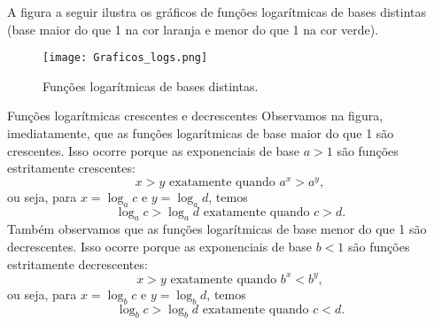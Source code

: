 A figura a seguir ilustra os gráficos de funções logarítmicas de bases distintas (base maior do que 1 na cor laranja e menor do que 1 na cor verde).

\begin{figure}[!htb]
\centering
\texttt{[image: Graficos\_logs.png]}
\caption{Funções logarítmicas de bases distintas.}
\end{figure}


\begin{observationtitle}{Funções logarítmicas crescentes e decrescentes}
Observamos na figura, imediatamente, que as funções logarítmicas de base maior do que 1 são crescentes. Isso ocorre porque as exponenciais de base $a>1$ são funções estritamente crescentes:
$$
x > y \mbox{ exatamente quando } a^x > a^y,
$$
ou seja, para $x=\log_a c$ e $y=\log_a d$, temos
$$
\log_a c > \log_a d \mbox{ exatamente quando } c > d.
$$
Também observamos que as funções logarítmicas de base menor do que 1 são decrescentes. Isso ocorre porque as exponenciais de base $b<1$ são funções estritamente decrescentes:
$$
x > y \mbox{ exatamente quando } b^x < b^y,
$$
ou seja, para $x=\log_b c$ e $y=\log_b d$, temos
$$
\log_b c > \log_b d \mbox{ exatamente quando } c < d.
$$

\end{observationtitle}
\clearpage

